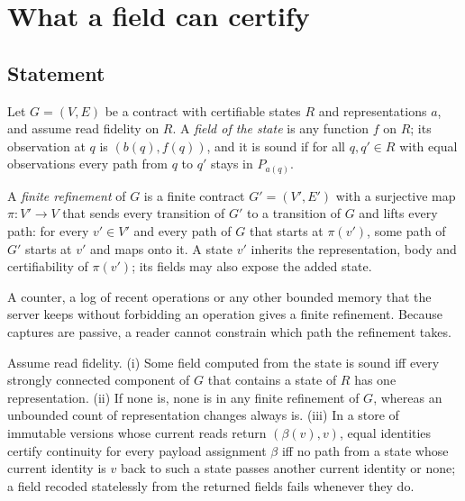 \section{What a field can certify}\label{sec:fields}

\subsection{Statement}
Let $G=(V,E)$ be a contract with certifiable states $R$ and representations
$a$, and assume read fidelity on $R$. A \emph{field of the state} is any
function $f$ on $R$; its observation at $q$ is $(b(q),f(q))$, and it is sound if
for all $q,q'\in R$ with equal observations every path from $q$ to $q'$ stays in
$P_{a(q)}$.

\begin{definition}\label{def:refinement}
A \emph{finite refinement} of $G$ is a finite contract $G'=(V',E')$ with a
surjective map $\pi:V'\to V$ that sends every transition of $G'$ to a
transition of $G$ and lifts every path: for every $v'\in V'$ and every path of
$G$ that starts at $\pi(v')$, some path of $G'$ starts at $v'$ and maps onto it.
A state $v'$ inherits the representation, body and certifiability of
$\pi(v')$; its fields may also expose the added state.
\end{definition}

A counter, a log of recent operations or any other bounded memory that the
server keeps without forbidding an operation gives a finite refinement. Because
captures are passive, a reader cannot constrain which path the refinement
takes.

\begin{proposition}\label{prop:repair}
Assume read fidelity. \textup{(i)} Some field computed from the state is sound
iff every strongly connected component of $G$ that contains a state of $R$ has
one representation. \textup{(ii)} If none is, none is in any finite refinement
of $G$, whereas an unbounded count of representation changes always is.
\textup{(iii)} In a store of immutable versions whose current reads return
$(\beta(v),v)$, equal identities certify continuity for every payload
assignment $\beta$ iff no path from a state whose current identity is $v$ back
to such a state passes another current identity or none; a field recoded
statelessly from the returned fields fails whenever they do.
\end{proposition}

